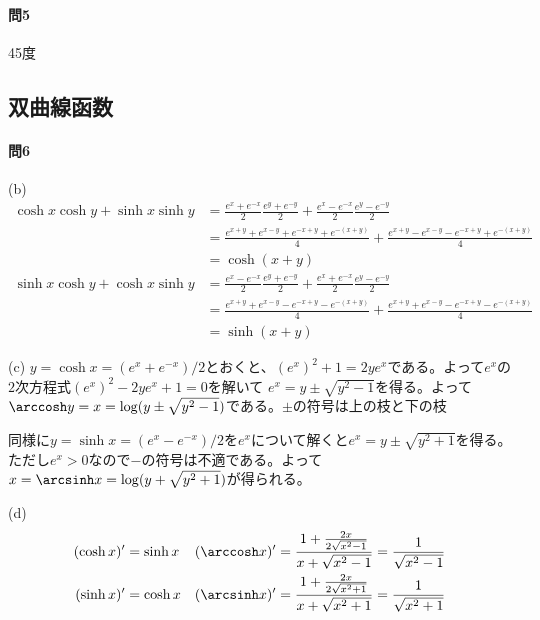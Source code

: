\paragraph{問5} 45度

\subsection{双曲線函数}

\paragraph{問6}
(b)
\begin{align*}
\cosh x \cosh y + \sinh x \sinh y
&= \frac{e^x + e^{-x}}{2} \frac{e^y + e^{-y}}{2} + \frac{e^x - e^{-x}}{2}\frac{e^y - e^{-y}}{2} \\
&= \frac{e^{x+y} + e^{x-y} + e^{-x+y} + e^{-(x+y)}}{4} + \frac{e^{x+y} - e^{x-y} - e^{-x+y} + e^{-(x+y)}}{4} \\
&= \cosh(x+y) \\
\sinh x \cosh y + \cosh x \sinh y
&= \frac{e^x - e^{-x}}{2} \frac{e^y + e^{-y}}{2} + \frac{e^x + e^{-x}}{2}\frac{e^y - e^{-y}}{2} \\
&= \frac{e^{x+y} + e^{x-y} - e^{-x+y} - e^{-(x+y)}}{4} + \frac{e^{x+y} + e^{x-y} - e^{-x+y} - e^{-(x+y)}}{4} \\
&= \sinh(x+y)
\end{align*}

\noindent (c) 
$y=\cosh x = (e^x+e^{-x})/2$とおくと、$(e^x)^2 + 1 = 2ye^x$である。よって$e^x$の$2$次方程式$(e^x)^2 - 2y e^x+1=0$を解いて
$e^x = y\pm\sqrt{y^2-1}$を得る。よって$\arccosh y = x = \log(y\pm\sqrt{y^2-1})$である。$\pm$の符号は上の枝と下の枝

同様に$y=\sinh x = (e^x - e^{-x})/2$を$e^x$について解くと$e^x=y\pm\sqrt{y^2+1}$を得る。ただし$e^x>0$なので$-$の符号は不適である。よって$x=\arcsinh x=\log(y+\sqrt{y^2+1})$が得られる。

\noindent (d)
\begin{align*}
(\cosh x)' &= \sinh x & 
(\arccosh x)' &= \frac{1+\frac{2x}{2\sqrt{x^2-1}}}{x+\sqrt{x^2-1}} = \frac{1}{\sqrt{x^2-1}} \\
(\sinh x)' &= \cosh x &
(\arcsinh x)' &= \frac{1+\frac{2x}{2\sqrt{x^2+1}}}{x+\sqrt{x^2+1}} = \frac{1}{\sqrt{x^2+1}}
\end{align*}
